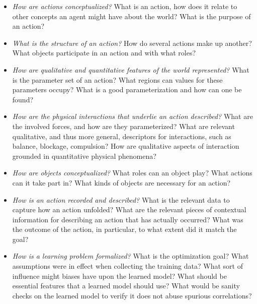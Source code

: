\begin{itemize}
    \item \emph{How are actions conceptualized?} What is an action, how does it relate to other concepts an agent might have about the world? What is the purpose of an action?
    \item \emph{What is the structure of an action?} How do several actions make up another? What objects participate in an action and with what roles?
    \item \emph{How are qualitative and quantitative features of the world represented?} What is the parameter set of an action? What regions can values for these parameters occupy? What is a good parameterization and how can one be found?
    \item \emph{How are the physical interactions that underlie an action described?} What are the involved forces, and how are they parameterized? What are relevant qualitative, and thus more general, descriptors for interactions, such as balance, blockage, compulsion? How are qualitative aspects of interaction grounded in quantitative physical phenomena?
    \item \emph{How are objects conceptualized?} What roles can an object play? What actions can it take part in? What kinds of objects are necessary for an action?
    \item \emph{How is an action recorded and described?} What is the relevant data to capture how an action unfolded? What are the relevant pieces of contextual information for describing an action that has actually occurred? What was the outcome of the action, in particular, to what extent did it match the goal?
    \item \emph{How is a learning problem formalized?} What is the optimization goal? What assumptions were in effect when collecting the training data? What sort of influence might biases have upon the learned model? What should be essential features that a learned model should use? What would be sanity checks on the learned model to verify it does not abuse spurious correlations?
\end{itemize}


